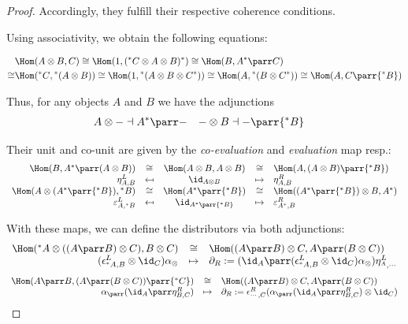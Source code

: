 \documentclass[DIN, pagenumber=false, fontsize=11pt, parskip=half, colorinlistoftodos, svgnames]{scrartcl}
\newcommand\mapsfrom{\mathrel{\reflectbox{\ensuremath{\mapsto}}}}
\begin{document}
\begin{proof}
		Accordingly, they fulfill their respective coherence conditions.
		
		Using associativity, we obtain the following equations:
		
		\begin{align*}
			&\Hom(A \otimes B, C) \cong \Hom(1 , ({^*C} \otimes A \otimes B)^*) \cong \Hom(B , A^* \parr C)
			\\
			\cong &
			\Hom({^*C} , {^*(A \otimes B)}) \cong \Hom(1, {^*(A \otimes B \otimes C^*)}) \cong \Hom(A , {^*(B \otimes C^*)}) \cong \Hom(A, C \parr {^*B}) 
		\end{align*}
		
		Thus, for any objects $A$ and $B$ we have the adjunctions 
		\begin{align*}
			A \otimes - &\dashv A^* \parr -
			&
			- \otimes B &\dashv - \parr {^*B}			
		\end{align*}
		
		Their unit and co-unit are given by the \emph{co-evaluation} and \emph{evaluation} map resp.:
		\begin{equation*}
			\begin{array}{rcccl}
					\Hom(B , A^* \parr (A \otimes B)) 
					& \cong &
					\Hom(A\otimes B, A \otimes B)
					& \cong &
					\Hom(A, (A \otimes B) \parr {^*B})
				\\
					\eta^L_{A, B}
					& \mapsfrom &
					\id_{A \otimes B}
					& \mapsto &
					\eta^R_{A,B}
				\\
					\Hom(A \otimes (A^* \parr {^*B}) , {^*B})
					& \cong &
					\Hom(A^* \parr {^*B})
					& \cong &
					\Hom((A^* \parr {^*B}) \otimes B, A^*)
				\\
					\varepsilon^L_{A, {^*B}}
					& \mapsfrom &
					\id_{A^* \parr {^*B}}
					& \mapsto &
					\varepsilon^R_{A^*, B} 
			\end{array}
		\end{equation*}
		
		With these maps, we can define the distributors via both adjunctions:
		\begin{equation*}
			\begin{array}{rcl}
					\Hom({^*A} \otimes ((A \parr B) \otimes C), B \otimes C) 
					& \cong &
					\Hom((A\parr B) \otimes C, A \parr (B \otimes C))
				\\
					(\epsilon^L_{{^*A}, B} \otimes \id_C)\alpha_\otimes
					& \mapsto &
					\partial_R := (\id_A \parr (\epsilon^L_{{^*A}, B} \otimes \id_C)\alpha_\otimes) \eta^L_{{^A}, \cdots}
			\end{array}
		\end{equation*}
		\begin{equation*}
			\begin{array}{rcl}
					\Hom(A \parr B, (A \parr (B\otimes C)) \parr {^*C})
					& \cong &
					\Hom((A\parr B) \otimes C, A \parr (B \otimes C))
				\\
					\alpha_\parr(\id_A \parr \eta^R_{B,C})
					& \mapsto &
					\partial_R := \epsilon^R_{\cdots, C} (\alpha_\parr(\id_A \parr \eta^R_{B,C}) \otimes \id_C)
			\end{array}
		\end{equation*}
		

\end{proof}
\end{document}
